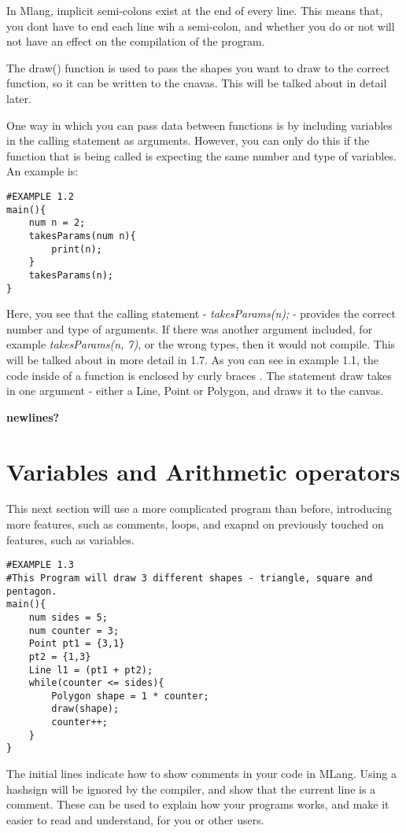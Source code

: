 \documentclass{l3proj}
\begin{document}
In Mlang, implicit semi-colons exist at the end of every line. This means that, you dont have to end each line wih a semi-colon, and whether you do or not will not have an effect on the compilation of the program. 

The draw() function is used to pass the shapes you want to draw to the correct function, so it can be written to the cnavas. This will be talked about in detail later.

One way in which you can pass data between functions is by including variables in the calling statement as arguments. However, you can only do this if the function that is being called is expecting the same number and type of variables. An example is:\\
\begin{lstlisting}
#EXAMPLE 1.2
main(){
	num n = 2;
	takesParams(num n){
		print(n);
	}
	takesParams(n);
}
\end{lstlisting}
Here, you see that the calling statement - \textit{takesParams(n);} - provides the correct number and type of arguments. If there was another argument included, for example \textit{takesParams(n, 7)}, or the wrong types, then it would not compile. This will be talked about in more detail in 1.7. As you can see in example 1.1, the code inside of a function is enclosed by curly braces {   }. The statement draw takes in one argument - either a Line, Point or Polygon, and draws it to the canvas.

\textbf{newlines?}

\section{Variables and Arithmetic operators}
This next section will use a more complicated program than before, introducing more features, such as comments, loops, and exapnd on previously touched on features, such as variables.
\begin{lstlisting}
#EXAMPLE 1.3
#This Program will draw 3 different shapes - triangle, square and pentagon.
main(){
	num sides = 5;
	num counter = 3;
	Point pt1 = {3,1}
	pt2 = {1,3}
	Line l1 = (pt1 + pt2);
	while(counter <= sides){
		Polygon shape =	1 * counter;
		draw(shape);
		counter++;
	}
}
\end{lstlisting}

The initial lines indicate how to show comments in your code in MLang. Using a hashsign will be ignored by the compiler, and show that the current line is a comment. These can be used to explain how your programs works, and make it easier to read and understand, for you or other users.
\end{document}

